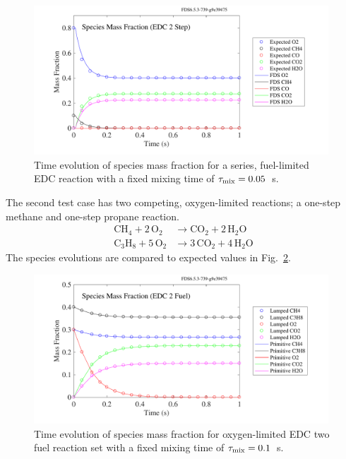 \documentclass[11pt]{book}
\begin{document}
\begin{figure}[h!]
\begin{center}
\includegraphics[height=2.2in]{SCRIPT_FIGURES/reactionrate_EDC_flim_2step}
\caption[Species evolution in 2-step methane EDC reaction]{Time evolution of species mass fraction for a series, fuel-limited EDC reaction with a fixed mixing time of $\tau_{\rm mix}=0.05$~s.}
\label{fig:EDC_2Step_fuel}
\end{center}
\end{figure}

The second test case has two competing, oxygen-limited reactions; a one-step methane and one-step propane reaction.
\begin{align}\label{eq:2step_o2_lim}
\mathrm{CH_4 + 2 \, O_2} &\rightarrow  \mathrm{CO_2 + 2 \, H_2O} \\
\nonumber \mathrm{C_3H_8 + 5 \, O_2} &\rightarrow \mathrm{3 \,CO_2 + 4 \, H_2O}
\end{align}
The species evolutions are compared to expected values in Fig.~\ref{fig:EDC_2Step_ox}.
\begin{figure}[h!]
\begin{center}
\includegraphics[height=2.2in]{SCRIPT_FIGURES/reactionrate_EDC_O2lim_2fuel}
\caption[Species evolution in two parallel EDC reactions]{Time evolution of species mass fraction for oxygen-limited EDC two fuel reaction set with a fixed mixing time of $\tau_{\rm mix}=0.1$~s.}
\label{fig:EDC_2Step_ox}
\end{center}
\end{figure}
\end{document}
